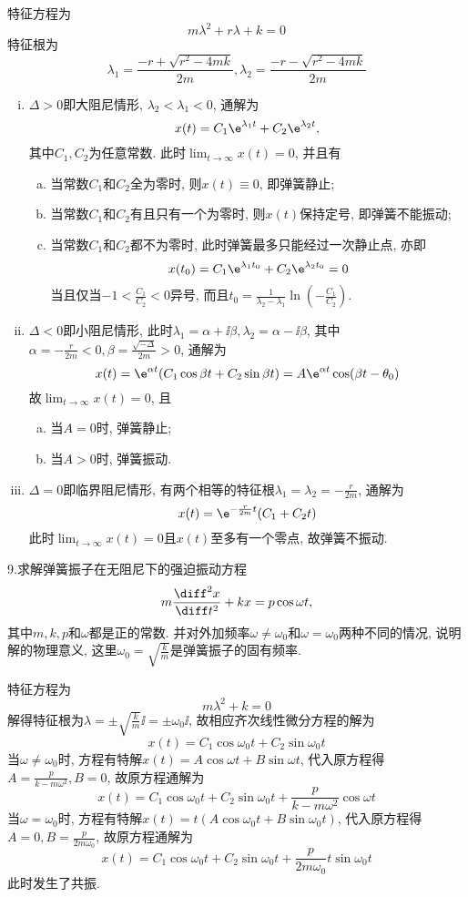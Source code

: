\begin{solve}
特征方程为\[m\lambda^2+r\lambda+k=0\]
特征根为\[\lambda_1=\frac{-r+\sqrt{r^2-4mk}}{2m},\lambda_2=\frac{-r-\sqrt{r^2-4mk}}{2m}\]
\begin{enumerate}[(i)]
\item $\Delta>0$即大阻尼情形, $\lambda_2<\lambda_1<0$, 通解为
\[x(t)=C_1\e^{\lambda_1t}+C_2\e^{\lambda_2t},\]
其中$C_1,C_2$为任意常数. 此时$\lim_{t\to\infty}x(t)=0$, 并且有
\begin{enumerate}[(a)]
\item 当常数$C_1$和$C_2$全为零时, 则$x(t)\equiv0$, 即弹簧静止;
\item 当常数$C_1$和$C_2$有且只有一个为零时, 则$x(t)$保持定号, 即弹簧不能振动;
\item 当常数$C_1$和$C_2$都不为零时, 此时弹簧最多只能经过一次静止点, 亦即
\[x(t_0)=C_1\e^{\lambda_1t_0}+C_2\e^{\lambda_2t_0}=0\]
当且仅当$-1<\frac{C_1}{C_2}<0$异号, 而且$t_0=\frac{1}{\lambda_2-\lambda_1}\ln\left(-\frac{C_1}{C_2}\right)$.
\end{enumerate}
\item $\Delta<0$即小阻尼情形, 此时$\lambda_1=\alpha+\ii\beta,\lambda_2=\alpha-\ii\beta$, 其中$\alpha=-\frac{r}{2m}<0,\beta=\frac{\sqrt{-\Delta}}{2m}>0$, 通解为
\[x(t)=\e^{\alpha t}(C_1\cos\beta t+C_2\sin\beta t)=A\e^{\alpha t}\cos(\beta t-\theta_0)\]
故$\lim_{t\to\infty}x(t)=0$, 且
\begin{enumerate}[(a)]
\item 当$A=0$时, 弹簧静止;
\item 当$A>0$时, 弹簧振动.
\end{enumerate}
\item $\Delta=0$即临界阻尼情形, 有两个相等的特征根$\lambda_1=\lambda_2=-\frac{r}{2m}$, 通解为
\[x(t)=\e^{-\frac{r}{2m}t}(C_1+C_2t)\]
此时$\lim_{t\to\infty}x(t)=0$且$x(t)$至多有一个零点, 故弹簧不振动.
\end{enumerate}
\end{solve}


9.求解弹簧振子在无阻尼下的强迫振动方程
\[m\frac{\diff^2x}{\diff t^2}+kx=p\cos\omega t,\]
其中$m,k,p$和$\omega$都是正的常数. 并对外加频率$\omega\neq\omega_0$和$\omega=\omega_0$两种不同的情况, 
说明解的物理意义, 这里$\omega_0=\sqrt{\frac{k}{m}}$是弹簧振子的固有频率.

\begin{solve}
特征方程为
\[m\lambda^2+k=0\]
解得特征根为$\lambda=\pm\sqrt{\frac{k}{m}}\ii=\pm\omega_0\ii$, 故相应齐次线性微分方程的解为
\[x(t)=C_1\cos\omega_0t+C_2\sin\omega_0t\]
当$\omega\neq\omega_0$时, 方程有特解$x(t)=A\cos\omega t+B\sin\omega t$, 代入原方程得$A=\frac{p}{k-m\omega^2},B=0$, 故原方程通解为
\[x(t)=C_1\cos\omega_0t+C_2\sin\omega_0t+\frac{p}{k-m\omega^2}\cos\omega t\]
当$\omega=\omega_0$时, 方程有特解$x(t)=t(A\cos\omega_0t+B\sin\omega_0t)$, 代入原方程得$A=0,B=\frac{p}{2m\omega_0}$, 故原方程通解为
\[x(t)=C_1\cos\omega_0t+C_2\sin\omega_0t+\frac{p}{2m\omega_0}t\sin\omega_0t\]
此时发生了共振.
\end{solve}


